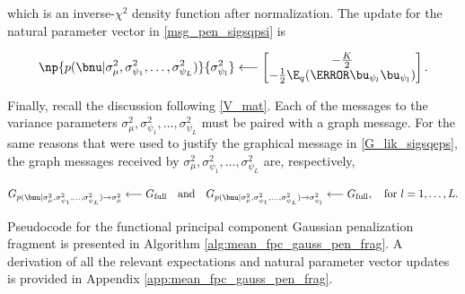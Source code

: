 \documentclass[12pt]{article}
\def\sigsqmu{\sigma^2_{\mu}}
\newcommand\upsi[1]{\bu_{\psi_{#1}}}
\newcommand\sigsqpsi[1]{\sigma^2_{\psi_{#1}}}
\theoremstyle{plain}
\theoremstyle{definition}
\theoremstyle{remark}
\begin{document}
\noindent which is an inverse-$\chi^2$ density function after normalization. The update for the natural parameter vector
in \eqref{msg_pen_sigsqpsi} is

\begin{equation}
	\np{p (\bnu | \sigsqmu, \sigsqpsi{1}, \dots, \sigsqpsi{L})}{\sigsqpsi{l}}
		\longleftarrow
			\begin{bmatrix}
				-\frac{K}{2} \\
				-\frac12 \E_q (\T{\upsi{l}} \upsi{l})
			\end{bmatrix}.
\label{np_pen_sigsqpsi}
\end{equation}

Finally, recall the discussion following \eqref{V_mat}. Each of the messages to the variance parameters $\sigsqmu,
\sigsqpsi{1}, \dots, \sigsqpsi{L}$ must be paired with a graph message. For the same reasons that were used to
justify the graphical message in \eqref{G_lik_sigsqeps}, the graph messages received by $\sigsqmu,
\sigsqpsi{1}, \dots, \sigsqpsi{L}$ are, respectively,

\begin{equation}
	G_{p (\bnu | \sigsqmu, \sigsqpsi{1}, \dots, \sigsqpsi{L}) \rightarrow \sigsqmu}
		\longleftarrow
			G_{\text{full}} \quad
	\text{and} \quad
	G_{p (\bnu | \sigsqmu, \sigsqpsi{1}, \dots, \sigsqpsi{L}) \rightarrow \sigsqpsi{l}}
		\longleftarrow
			G_{\text{full}}, \quad \text{for $l = 1, \dots, L$.}
\label{G_pen}
\end{equation}

Pseudocode for the functional principal component Gaussian penalization fragment is presented in Algorithm
\ref{alg:mean_fpc_gauss_pen_frag}.
A derivation of all the relevant expectations and natural parameter vector updates is provided in Appendix
\ref{app:mean_fpc_gauss_pen_frag}.
\end{document}
